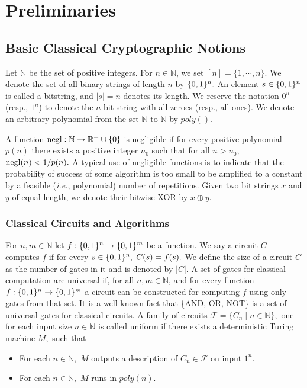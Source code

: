 \section{Preliminaries}
\subsection{Basic Classical Cryptographic Notions}
\label{sec:classical-prelims}
Let $\mathbb{N}$ be the set of positive integers. For $n \in \mathbb{N}$, we set $[n] = \{1, \cdots, n\}.$ We denote the set of all  binary strings of length $n$ by $\{0,1\}^{n}.$
 An element $s \in \{0,1\}^{n}$ is called a bitstring, and $|s|=n$ denotes its length. We reserve the notation $0^n$ (resp., $1^n$) to denote the $n$-bit string with all zeroes (resp., all ones).  We denote an arbitrary polynomial from the set $\mathbb{N}$ to $\mathbb{N}$ by $poly( ).$


A function ${\rm negl}:\mathbb{N}\rightarrow\mathbb{R}^{+}\cup \{0\}$ is negligible if for every positive polynomial $p(n)$ there exists a positive integer $n_0$ such that  for all  $n>n_0,$ ${\rm negl}(n) < 1/ p(n).$   A typical use of negligible functions is to indicate that the probability of success of some algorithm is too small to be amplified to a constant by a feasible (\emph{i.e.}, polynomial) number of repetitions. Given two bit strings $x$ and $y$ of equal length, we denote their bitwise XOR by $x \oplus y.$

\subsubsection{Classical Circuits and Algorithms}
 For $n, m\in\mathbb{N}$ let  $f:\{0,1\}^{n}\rightarrow \{0,1\}^{m}$ be a function. We say a circuit $C$ computes $f$ if for every $s \in \{0,1\}^{n},\; C(s)=f(s).$  We define the size of a circuit $C$ as the number of gates in it and is denoted by $|C|.$ A set of gates for classical computation  are universal if, for all $n, m\in\mathbb{N}$, and for every function $f:\{0,1\}^{n}\rightarrow \{0,1\}^{m}$ a circuit can be constructed for computing $f$ using only gates from that set. It is a well known fact that \{AND, OR, NOT\} is a set of universal gates for classical circuits. A family of circuits $\mathcal{F}=\{C_n\mid n\in\mathbb{N}\},$ one for each input  size $n\in \mathbb{N}$ is called uniform if there exists a deterministic Turing machine $M,$ such that
 \begin{itemize}
 \item For each $n\in\mathbb{N},$ $M$ outputs a description of $C_n \in \mathcal{F}$ on input $1^n.$
 \item  For each $n\in\mathbb{N},$ $M$ runs in $poly(n).$
 \end{itemize}




